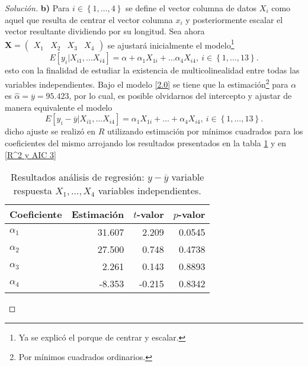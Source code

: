 \documentclass[10.5pt,notitlepage]{article}
\newenvironment{solucion}
  {\begin{proof}[Solución]}
  {\end{proof}}
\newcommand{\kis}[1]{\left\{ #1 \right\}}
\theoremstyle{plain}
\begin{document}
\begin{solucion}
\noindent \textbf{b)} Para \(i \in \kis{1,\hdots,4}\) se define el vector columna de datos \(X_i\) como aquel que resulta de centrar el vector columna \(x_i\) y posteriormente escalar el vector resultante dividiendo por su longitud. Sea ahora \(\mathbf{X} = \begin{pmatrix}  X_1 & X_2 & X_3 & X_4\end{pmatrix}\) se ajustará inicialmente el modelo\footnote{Ya se explicó el porque de centrar y escalar.} 
\begin{equation}\label{2.0}
    E[y_{i}| X_{i1}, \hdots X_{i4}] = \alpha + \alpha_{1} X_{1i} + \hdots \alpha_{4} X_{i4}, \ i \in \kis{1, \hdots, 13}.
\end{equation}
esto con la finalidad de estudiar la existencia de multicolinealidad entre todas las variables independientes. Bajo el modelo \eqref{2.0} se tiene que la estimación\footnote{Por mínimos cuadrados ordinarios.} para \(\alpha\) es \(\hat{\alpha} = \overline{y} = 95.423\), por lo cual, es posible olvidarnos del intercepto y ajustar de manera equivalente el modelo
\begin{equation}\label{2.2}
    E[y_{i} - \overline{y}| X_{i1}, \hdots X_{i4}] =  \alpha_{1} X_{1i} + \hdots+ \alpha_{4} X_{i4}, \ i \in \kis{1, \hdots, 13}.
\end{equation}
dicho ajuste se realizó en \(R\) utilizando estimación por mínimos cuadrados para los coeficientes del mismo arrojando los resultados presentados en la tabla \ref{tab:ref10} y en \eqref{R^2 y AIC 3}
\begin{table}[H]
        \centering
        \begin{tabular}{@{}l@{\hskip 0.3in}r@{\hskip 0.3in}r@{\hskip 0.3in}r@{}}
            \toprule
            Coeficiente& Estimación & \(t\)-valor& \(p\)-valor \\
            \midrule
\(\alpha_1\) &   31.607 &    2.209&   0.0545 \\
\(\alpha_2\) & 27.500   &    0.748&    0.4738 \\ 
\(\alpha_3\)  &  2.261  &   0.143 &  0.8893 \\
\(\alpha_4\)  & -8.353  &   -0.215 &  0.8342\\ 
            \bottomrule
        \end{tabular}
        \caption{Resultados análisis de regresión: \(y - \overline{y}\) variable respuesta \(X_1, \hdots, X_4\) variables independientes.}
        \label{tab:ref10}
\end{table}
\begin{equation}\label{R^2 y AIC 3}

\end{equation}
\end{solucion}
\end{document}
